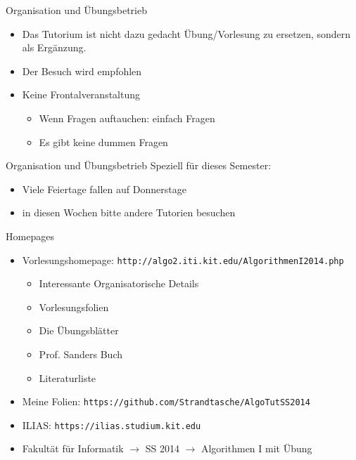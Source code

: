 \documentclass[18pt]{beamer}
\begin{document}
	\begin{frame}{Organisation und Übungsbetrieb}
		\begin{itemize}
			\item Das Tutorium ist nicht dazu gedacht Übung/Vorlesung zu ersetzen, sondern als Ergänzung.
			\item Der Besuch wird empfohlen
			\item Keine Frontalveranstaltung
			\begin{itemize}
				\item Wenn Fragen auftauchen: einfach Fragen
				\item Es gibt keine dummen Fragen
			\end{itemize}
		\end{itemize}
	\end{frame}

	\begin{frame}{Organisation und Übungsbetrieb}
		Speziell für dieses Semester:
		\begin{itemize}
			\item Viele Feiertage fallen auf Donnerstage
			\item in diesen Wochen bitte andere Tutorien besuchen 
		\end{itemize}		
	\end{frame}

	\begin{frame}{Homepages}
		\begin{itemize}
			\item Vorlesungshomepage: \texttt{http://algo2.iti.kit.edu/AlgorithmenI2014.php}
			\begin{itemize}
				\item Interessante Organisatorische Details
				\item Vorlesungsfolien
				\item Die Übungsblätter
				\item Prof. Sanders Buch
				\item Literaturliste
			\end{itemize}
			\item Meine Folien: \texttt{https://github.com/Strandtasche/AlgoTutSS2014}
			\item ILIAS: \texttt{https://ilias.studium.kit.edu}
			\item Fakultät für Informatik $\rightarrow$ SS 2014 $\rightarrow$ Algorithmen I mit Übung			
		\end{itemize}		
	\end{frame}
\end{document}
